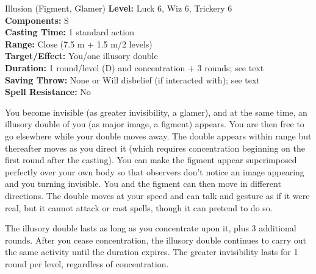 {Illusion (Figment, Glamer)}
{
	\textbf{Level:}
	Luck 6, Wiz 6, Trickery 6\\
	\textbf{Components:}
	S\\
	\textbf{Casting Time:}
	1 standard action\\
	\textbf{Range:}
	Close (7.5 m + 1.5 m/2 levels)\\
	\textbf{Target/Effect:}
	You/one illusory double\\
	\textbf{Duration:}
	1 round/level (D) and concentration + 3 rounds; see text\\
	\textbf{Saving Throw:}
	None or Will disbelief (if interacted with); see text\\
	\textbf{Spell Resistance:}
	No\\
}
{
	You become invisible (as greater invisibility, a glamer), and at the same time, an illusory double of you (as major image, a figment) appears. You are then free to go elsewhere while your double moves away. The double appears within range but thereafter moves as you direct it (which requires concentration beginning on the first round after the casting). You can make the figment appear superimposed perfectly over your own body so that observers don't notice an image appearing and you turning invisible. You and the figment can then move in different directions. The double moves at your speed and can talk and gesture as if it were real, but it cannot attack or cast spells, though it can pretend to do so.

	The illusory double lasts as long as you concentrate upon it, plus 3 additional rounds. After you cease concentration, the illusory double continues to carry out the same activity until the duration expires. The greater invisibility lasts for 1 round per level, regardless of concentration.

}
